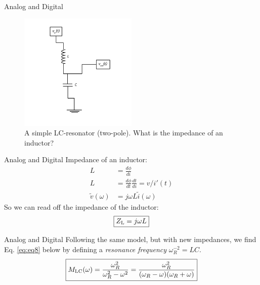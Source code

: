 \documentclass{beamer}
\begin{document}
\begin{frame}{Analog and Digital}
\begin{figure}
\centering
\includegraphics[width=0.5\textwidth]{AnalogExample/LowPassLC.pdf}
\caption{\label{fig:example4} A simple LC-resonator (two-pole).  What is the impedance of an inductor?}
\end{figure}
\end{frame}

\begin{frame}{Analog and Digital}
Impedance of an inductor:
\begin{align}
L &= \frac{d\phi}{di} \\
L &= \frac{d\phi}{dt}\frac{dt}{di} = v/i'(t) \\
\tilde{v}(\omega) &= j\omega L\tilde{i}(\omega)
\end{align}
So we can read off the impedance of the inductor:
\begin{equation}
\boxed{
Z_{\rm L} = j\omega L}
\end{equation}
\end{frame}

\begin{frame}{Analog and Digital}
Following the same model, but with new impedances, we find Eq. \ref{eq:eq8} below by defining a \textit{resonance frequency} $\omega_R^{-2} = LC$. 
\begin{equation}
\boxed{
M_{\rm LC}(\omega) = \frac{\omega_R^2}{\omega_R^2-\omega^2} = \frac{\omega_R^2}{(\omega_R-\omega)(\omega_R + \omega)}
}
\label{eq:eq10}
\end{equation}
\end{frame}
\end{document}
